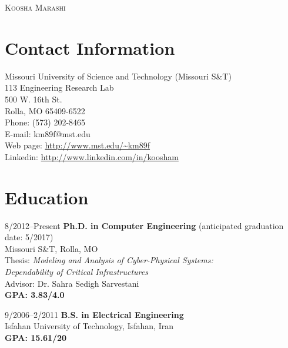 \documentclass[10pt]{article}
\begin{document}
\thispagestyle{empty}

\begin{center}

%

{\huge{\textsc{Koosha Marashi}}}

\end{center}

\section{Contact Information}

\begin{flushleft}

    Missouri University of Science and Technology (Missouri S\&T)\\
    113 Engineering Research Lab \\
    500 W. 16th St. \\
    Rolla, MO 65409-6522 \\
    Phone: (573) 202-8465 \\
    E-mail: km89f@mst.edu \\
    Web page: \url{http://www.mst.edu/\~km89f} \\
    Linkedin: \url{http://www.linkedin.com/in/koosham}

\end{flushleft}

\section{Education}

\begin{CV}

\item[8/2012--Present] \textbf{Ph.D. in Computer Engineering} (anticipated graduation date: 5/2017)\\Missouri S\&T, Rolla, MO \\
    Thesis: \emph{Modeling and Analysis of Cyber-Physical Systems:\\Dependability of Critical Infrastructures} \\
    Advisor: Dr. Sahra Sedigh Sarvestani \\
    \textbf{GPA: 3.83/4.0}

\item[9/2006--2/2011] \textbf{B.S. in Electrical Engineering} \\ Isfahan University of Technology, Isfahan, Iran \\
    \textbf{GPA: 15.61/20}

\end{CV}
\end{document}
